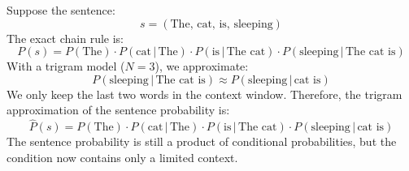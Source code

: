 \highspace
\begin{examplebox}
    Suppose the sentence:
    \begin{equation*}
        s = \left(\text{The}, \, \text{cat}, \, \text{is}, \, \text{sleeping}\right)
    \end{equation*}
    The exact chain rule is:
    \begin{equation*}
        P\left(s\right) = P\left(\text{The}\right) \cdot P\left(\text{cat} \, | \, \text{The}\right) \cdot P\left(\text{is} \, | \, \text{The cat}\right) \cdot P\left(\text{sleeping} \, | \, \text{The cat is}\right)
    \end{equation*}
    With a trigram model ($N=3$), we approximate:
    \begin{equation*}
        P\left(\text{sleeping} \, | \, \text{The cat is}\right) \approx P\left(\text{sleeping} \, | \, \text{cat is}\right)
    \end{equation*}
    We only keep the last two words in the context window. Therefore, the trigram approximation of the sentence probability is:
    \begin{equation*}
        \hat{P}\left(s\right) = P\left(\text{The}\right) \cdot P\left(\text{cat} \, | \, \text{The}\right) \cdot P\left(\text{is} \, | \, \text{The cat}\right) \cdot P\left(\text{sleeping} \, | \, \text{cat is}\right)
    \end{equation*}
    The sentence probability is still a product of conditional probabilities, but the condition now contains only a limited context.
\end{examplebox}

